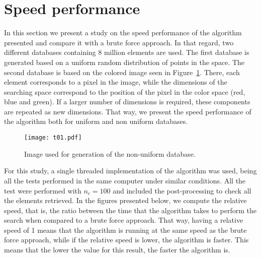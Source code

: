 \documentclass[review]{elsarticle}
\begin{document}
\section{Speed performance}
\label{sec:performance}

In this section we present a study on the speed performance of the algorithm presented and compare it with a brute force approach. In that regard, two different databases containing 8 million elements are used. The first database is generated based on a uniform random distribution of points in the space. The second database is based on the colored image seen in Figure~\ref{fig:tulip}. There, each element corresponds to a pixel in the image, while the dimensions of the searching space correspond to the position of the pixel in the color space (red, blue and green). If a larger number of dimensions is required, these components are repeated as new dimensions.  That way, we present the speed performance of the algorithm both for uniform and non uniform databases.

\begin{figure}[h!]
	\centering
	\texttt{[image: t01.pdf]}
	\caption{Image used for generation of the non-uniform database.}
	\label{fig:tulip}
\end{figure}

For this study, a single threaded implementation of the algorithm was used, being all the tests performed in the same computer under similar conditions. All the test were performed with $n_c = 100$ and included the post-processing to check all the elements retrieved. In the figures presented below, we compute the relative speed, that is, the ratio between the time that the algorithm takes to perform the search when compared to a brute force approach. That way, having a relative speed of 1 means that the algorithm is running at the same speed as the brute force approach, while if the relative speed is lower, the algorithm is faster. This means that the lower the value for this result, the faster the algorithm is.
\end{document}
